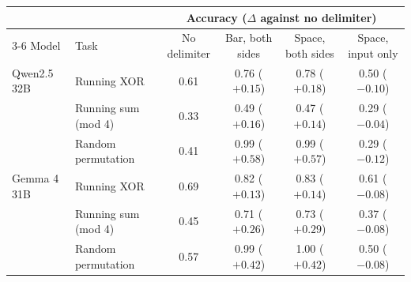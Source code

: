 \begin{tabular}{ll cccc}
\toprule
& & \multicolumn{4}{c}{Accuracy ($\Delta$ against no delimiter)} \\
\cmidrule(lr){3-6}
Model & Task & No delimiter & Bar, both sides & Space, both sides & Space, input only \\
\midrule
Qwen2.5 32B & Running XOR & 0.61 & 0.76 ($+0.15$) & 0.78 ($+0.18$) & 0.50 ($-0.10$) \\
 & Running sum (mod 4) & 0.33 & 0.49 ($+0.16$) & 0.47 ($+0.14$) & 0.29 ($-0.04$) \\
 & Random permutation & 0.41 & 0.99 ($+0.58$) & 0.99 ($+0.57$) & 0.29 ($-0.12$) \\
Gemma 4 31B & Running XOR & 0.69 & 0.82 ($+0.13$) & 0.83 ($+0.14$) & 0.61 ($-0.08$) \\
 & Running sum (mod 4) & 0.45 & 0.71 ($+0.26$) & 0.73 ($+0.29$) & 0.37 ($-0.08$) \\
 & Random permutation & 0.57 & 0.99 ($+0.42$) & 1.00 ($+0.42$) & 0.50 ($-0.08$) \\
\bottomrule
\end{tabular}
